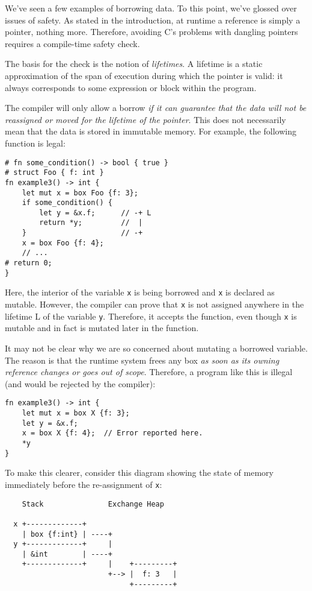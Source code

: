 \documentclass[]{article}
\begin{document}
We've seen a few examples of borrowing data. To this point, we've
glossed over issues of safety. As stated in the introduction, at runtime
a reference is simply a pointer, nothing more. Therefore, avoiding C's
problems with dangling pointers requires a compile-time safety check.

The basis for the check is the notion of \emph{lifetimes}. A lifetime is
a static approximation of the span of execution during which the pointer
is valid: it always corresponds to some expression or block within the
program.

The compiler will only allow a borrow \emph{if it can guarantee that the
data will not be reassigned or moved for the lifetime of the pointer}.
This does not necessarily mean that the data is stored in immutable
memory. For example, the following function is legal:

\begin{verbatim}
# fn some_condition() -> bool { true }
# struct Foo { f: int }
fn example3() -> int {
    let mut x = box Foo {f: 3};
    if some_condition() {
        let y = &x.f;      // -+ L
        return *y;         //  |
    }                      // -+
    x = box Foo {f: 4};
    // ...
# return 0;
}
\end{verbatim}

Here, the interior of the variable \texttt{x} is being borrowed and
\texttt{x} is declared as mutable. However, the compiler can prove that
\texttt{x} is not assigned anywhere in the lifetime L of the variable
\texttt{y}. Therefore, it accepts the function, even though \texttt{x}
is mutable and in fact is mutated later in the function.

It may not be clear why we are so concerned about mutating a borrowed
variable. The reason is that the runtime system frees any box \emph{as
soon as its owning reference changes or goes out of scope}. Therefore, a
program like this is illegal (and would be rejected by the compiler):

\begin{verbatim}
fn example3() -> int {
    let mut x = box X {f: 3};
    let y = &x.f;
    x = box X {f: 4};  // Error reported here.
    *y
}
\end{verbatim}

To make this clearer, consider this diagram showing the state of memory
immediately before the re-assignment of \texttt{x}:

\begin{verbatim}
    Stack               Exchange Heap

  x +-------------+
    | box {f:int} | ----+
  y +-------------+     |
    | &int        | ----+
    +-------------+     |    +---------+
                        +--> |  f: 3   |
                             +---------+
\end{verbatim}
\end{document}
